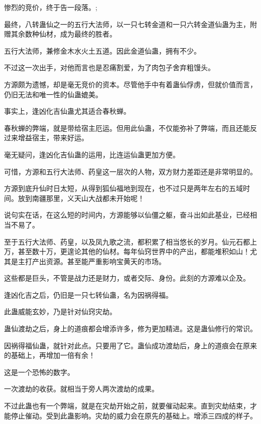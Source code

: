 
\begin{this_body}



惨烈的竞价，终于告一段落。;

最终，八转蛊仙之一的五行大法师，以一只七转金道和一只六转金道仙蛊为主，附赠其余数种仙材，成为最终的胜者。

五行大法师，兼修金木水火土五道。因此金道仙蛊，拥有不少。

不过这一次出手，对他而言也是忍痛割爱，为了肉包子舍弃粗馒头。

方源颇为遗憾，却是毫无竞价的资本。尽管他手中有着蛊仙俘虏，但就价值而言，仍旧无法和唯一性的仙蛊媲美。

事实上，逢凶化吉仙蛊尤其适合春秋蝉。

春秋蝉的弊端，就是带给宿主厄运。但用此仙蛊，不仅能弥补了弊端，而且还能反过来增益宿主，带来好运。

毫无疑问，逢凶化吉仙蛊的运用，比连运仙蛊更加方便。

可惜，方源和五行大法师、药皇这一层次的人物，双方财力差距还是非常明显的。

方源到底升仙时日太短，从得到狐仙福地到现在，也不过只是两年左右的五域时间。放到南疆那里，义天山大战都未开始呢！

说句实在话，在这么短的时间内，方源能够以仙僵之躯，奋斗出如此基业，已经相当不易了。

至于五行大法师、药皇，以及凤九歌之流，都积累了相当悠长的岁月。仙元石都上万，甚至数十万，更遑论其他的仙材。每年仙窍世界中的产出，都能堆积如山！尤其是主打产出资源。甚至能严重影响宝黄天的市场。

这些都是巨头，不管是战力还是财力，或者交际、身份。此刻的方源难以企及。

逢凶化吉之后，仍旧是一只七转仙蛊，名为因祸得福。

此蛊威能玄妙，乃是针对仙窍灾劫。

蛊仙渡劫之后，身上的道痕都会增添许多，修为更加精进。这是蛊仙修行的常识。

因祸得福仙蛊，就针对此点。只要用了它。蛊仙成功渡劫后，身上的道痕会在原来的基础上，再增加一倍有余！

这是一个恐怖的数字。

一次渡劫的收获。就相当于旁人两次渡劫的成果。

不过此蛊也有一个弊端，就是在灾劫开始之前，就要催动起来。直到灾劫结束，才能停止催动。受到此蛊影响。灾劫的威力会在原先的基础上。增添三四成的样子。


\end{this_body}

